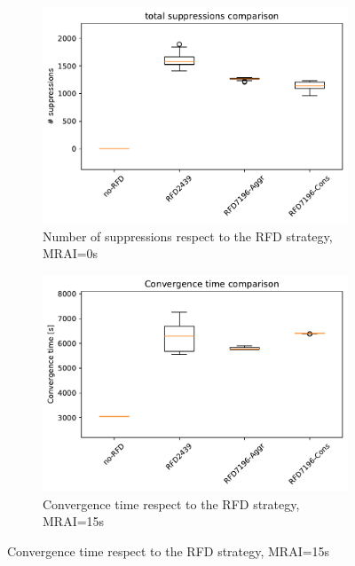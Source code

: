\begin{figure}[H]
\begin{subfigure}[b]{0.325\textwidth}
     \end{subfigure}
     \hfill
     \begin{subfigure}[b]{0.325\textwidth}
         \centering
         \includegraphics[width=\textwidth]{images/RFD/miceVSelephants/MultiMRAI/0/mice/cisco_1000MRAI0_rfd_comparison_suppressions_boxplot.pdf}
         \caption{Number of suppressions respect to the RFD strategy, MRAI=0s}
         \label{fig:1000_RFD_MRAI30_suppressions_mice}
     \end{subfigure}
     \vfill
     \begin{subfigure}[b]{0.325\textwidth}
         \centering
         \includegraphics[width=\textwidth]{images/RFD/miceVSelephants/MultiMRAI/15/mice/cisco_1000MRAI15_rfd_comparison_time_boxplot.pdf}
         \caption{Convergence time respect to the RFD strategy, MRAI=15s}

\end{subfigure}
\end{figure}
